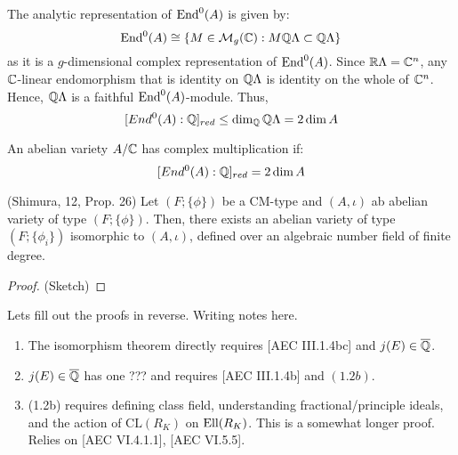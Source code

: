 \documentclass[12pt]{article}
\begin{document}
The analytic representation of $\operatorname{End}^0(A)$ is given by: 
\[ \operatorname{End}^0(A) \cong \{M \in \mathcal M_g(\mathbb C) : M\mathbb Q\Lambda \subset \mathbb Q\Lambda\}\]
as it is a $g$-dimensional complex representation of $\operatorname{End}^0(A)$. Since $\mathbb R\Lambda = \mathbb C^n$, any $\mathbb C$-linear endomorphism  that is identity on $\mathbb Q\Lambda$ is identity on the whole of $\mathbb C^n$. Hence, $\mathbb Q\Lambda$ is a faithful $\operatorname{End}^0(A)$-module. Thus, 
\[ [End^0(A): \mathbb Q]_{red} \leq \dim_\mathbb Q \mathbb Q\Lambda = 2\dim A\]
\begin{definition}
   An abelian variety $A/\mathbb C$ has complex multiplication if:
   \[ [End^0(A): \mathbb Q]_{red} = 2\dim A\]
\end{definition}


\begin{theorem}(Shimura, 12, Prop. 26)
    Let $(F; \{\phi\})$ be a CM-type and $(A, \iota)$ ab abelian variety of type $(F; \{\phi\})$. Then, there exists an abelian variety of type $(F; \{\phi_i\})$ isomorphic to $(A, \iota)$, defined over an algebraic number field of finite degree.
\end{theorem}
\begin{proof}(Sketch)
    
\end{proof}





\newpage
Lets fill out the proofs in reverse. Writing notes here.
\begin{enumerate}
    \item The isomorphism theorem directly requires [AEC III.1.4bc] and $j(E) \in \overline{\mathbb Q}$.
    \item $j(E) \in \overline{\mathbb Q}$ has one ??? and requires [AEC III.1.4b] and $(1.2b)$.
    \item (1.2b) requires defining class field, understanding fractional/principle ideals, and the action of $\text{CL}(R_K)$ on $\operatorname{Ell}(R_K)$. This is a somewhat longer proof. Relies on [AEC VI.4.1.1], [AEC VI.5.5].
\end{enumerate}




\end{document}
